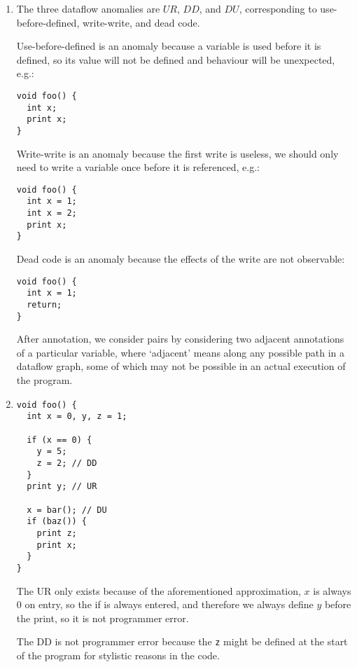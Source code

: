 


\begin{enumerate}[label=(\alph*)]
        
  \item

    The three dataflow anomalies are $UR$, $DD$, and $DU$, corresponding to use-before-defined, write-write, and dead code.

    Use-before-defined is an anomaly because a variable is used before it is defined, so its value will not be defined and behaviour will be unexpected, e.g.:

\begin{verbatim}
void foo() {
  int x;
  print x;
}
\end{verbatim}

Write-write is an anomaly because the first write is useless, we should only need to write a variable once before it is referenced, e.g.:

\begin{verbatim}
void foo() {
  int x = 1;
  int x = 2;
  print x;
}
\end{verbatim}

Dead code is an anomaly because the effects of the write are not observable:

\begin{verbatim}
void foo() {
  int x = 1;
  return;
}
\end{verbatim}

After annotation, we consider pairs by considering two adjacent annotations of a particular variable, where `adjacent' means along any possible path in a dataflow graph, some of which may not be possible in an actual execution of the program.

\item
\begin{verbatim}
void foo() {
  int x = 0, y, z = 1;

  if (x == 0) {
    y = 5;
    z = 2; // DD
  }
  print y; // UR

  x = bar(); // DU
  if (baz()) {
    print z;
    print x;
  }
}
\end{verbatim}

The UR only exists because of the aforementioned approximation, $x$ is always 0 on entry, so the if is always entered, and therefore we always define $y$ before the print, so it is not programmer error.

The DD is not programmer error because the \texttt{z} might be defined at the start of the program for stylistic reasons in the code.


\end{enumerate}
